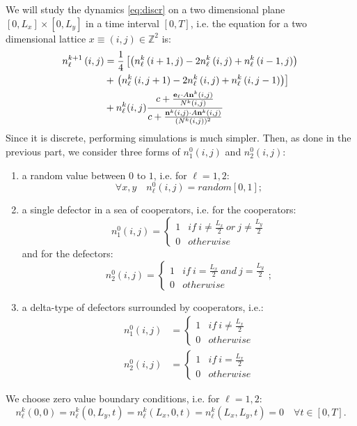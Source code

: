We will study the dynamics \ref{eq:discr} on a two dimensional plane
$\left[0,L_{x}\right]\times\left[0,L_{y}\right]$ in a time interval
$\left[0,T\right]$, i.e. the equation for a two dimensional lattice
$x\equiv\left(i,j\right)\in\mathbb{Z}^{2}$ is:
\begin{align*}
n_{\ell}^{k+1}\left(i,j\right) & =\frac{1}{4}\left[\left(n_{\ell}^{k}\left(i+1,j\right)-2n_{\ell}^{k}\left(i,j\right)+n_{\ell}^{k}\left(i-1,j\right)\right)\right.\\
 & +\left.\left(n_{\ell}^{k}\left(i,j+1\right)-2n_{\ell}^{k}\left(i,j\right)+n_{\ell}^{k}\left(i,j-1\right)\right)\right]\\
 & +n_{\ell}^{k}(i,j)\frac{c+\frac{{\bf e}_{\ell}\cdot A{\bf n}^{k}(i,j)}{N^{k}(i,j)}}{c+\frac{{\bf n}^{k}\left(i,j\right)\cdot A{\bf n}^{k}(i,j)}{(N^{k}(i,j))^{2}}}
\end{align*}
Since it is discrete, performing simulations is much simpler. Then,
as done in the previous part, we consider three forms of $n_{1}^{0}\left(i,j\right)$
and $n_{2}^{0}\left(i,j\right)$:
\begin{enumerate}
\item a random value between $0$ to $1$, i.e. for $\ell=1,2$:
\[
\forall x,y\quad n_{\ell}^{0}\left(i,j\right)=random\left[0,1\right];
\]
\item a single defector in a sea of cooperators, i.e. for the cooperators:
\[
n_{1}^{0}\left(i,j\right)=\begin{cases}
1 & if\ i\neq\frac{L_{x}}{2}\ or\ j\neq\frac{L_{y}}{2}\\
0 & otherwise
\end{cases}
\]
 and for the defectors:
\[
n_{2}^{0}\left(i,j\right)=\begin{cases}
1 & if\ i=\frac{L_{x}}{2}\ and\ j=\frac{L_{y}}{2}\\
0 & otherwise
\end{cases};
\]
\item a delta-type of defectors surrounded by cooperators, i.e.:
\begin{align*}
n_{1}^{0}\left(i,j\right) & =\begin{cases}
1 & if\ i\neq\frac{L_{x}}{2}\\
0 & otherwise
\end{cases}\\
n_{2}^{0}\left(i,j\right) & =\begin{cases}
1 & if\ i=\frac{L_{x}}{2}\\
0 & otherwise
\end{cases}
\end{align*}
\end{enumerate}
We choose zero value boundary conditions, i.e. for $\ell=1,2$:
\[
n_{\ell}^{k}\left(0,0\right)=n_{\ell}^{k}\left(0,L_{y},t\right)=n_{\ell}^{k}\left(L_{x},0,t\right)=n_{\ell}^{k}\left(L_{x},L_{y},t\right)=0\quad\forall t\in\left[0,T\right].
\]


